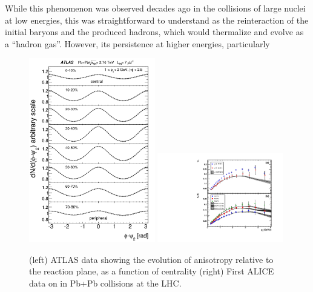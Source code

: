 While this phenomenon was observed decades ago in the collisions of large
nuclei at low energies, this was straightforward to understand as the
reinteraction of the initial baryons and the produced hadrons, which
would thermalize and evolve as a ``hadron gas''.  
However, its persistence at higher energies, particularly 
\begin{figure}[!htb]
\begin{center}
\includegraphics[width=0.49\textwidth]{flowcorrelations_figs/atlas_v2_fig_02.pdf}
\includegraphics[width=0.49\textwidth]{flowcorrelations_figs/fig2.pdf}
\caption[]{(left) ATLAS data showing the evolution of anisotropy relative to the reaction plane, as a function of centrality (right) First ALICE data on \vtwo in Pb+Pb collisions at the LHC.}
\label{fig:pas:fc:firstreusults}
\end{center}
\end{figure}


